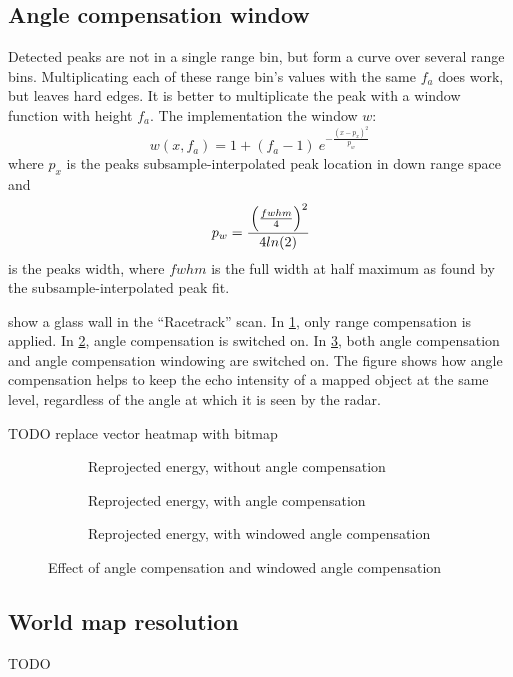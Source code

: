 \subsection{Angle compensation window}\label{angle-compensation-window}

Detected peaks are not in a single range bin, but form a curve over
several range bins. Multiplicating each of these range bin's values with
the same \(f_a\) does work, but leaves hard edges. It is better to
multiplicate the peak with a window function with height \(f_a\). The
implementation the window \(w\):
\[
w(x,f_a) = 1 + (f_a - 1) ~e ^ { -\frac{ \left( {x - p_x} \right) ^ 2 } {p_w} }
\] where \(p_x\) is the peaks subsample-interpolated peak location in
down range space and
\[
p_w = \cfrac{
\left( \frac{fwhm}{4}  \right) ^2
}{
4 ln(2)}
\]
is
the peaks width, where \(fwhm\) is the full width at half maximum as
found by the subsample-interpolated peak fit.

 show a glass wall in the ``Racetrack'' scan. In \cref{fig:fig_angle_compensation_comparison_1}, only range compensation is applied. In \cref{fig:fig_angle_compensation_comparison_2},
angle compensation is switched on. In \cref{fig:fig_angle_compensation_comparison_3}, both angle
compensation and angle compensation windowing are switched on. The
figure shows how angle compensation helps to keep the echo intensity of
a mapped object at the same level, regardless of the angle at which it
is seen by the radar.

TODO replace vector heatmap with bitmap
\begin{figure}[htbp]
    \centering
    \begin{subfigure}{\textwidth}
        \centering
        \def\svgscale{0.8} \small
        
        \caption{Reprojected energy, without angle compensation}
        \label{fig:fig_angle_compensation_comparison_1}
        \bigskip
    \end{subfigure}
    \begin{subfigure}{\textwidth}
        \centering
        \def\svgscale{0.8} \small
        
        \caption{Reprojected energy, with angle compensation}
        \label{fig:fig_angle_compensation_comparison_2}
        \bigskip
    \end{subfigure}
    \begin{subfigure}{\textwidth}
        \centering
        \def\svgscale{0.8} \small
        
        \caption{Reprojected energy, with windowed angle compensation}
        \label{fig:fig_angle_compensation_comparison_3}
        \bigskip
    \end{subfigure}
    \caption{Effect of angle compensation and windowed angle compensation}
    \label{fig:fig_angle_compensation_comparison}
\end{figure}


\subsection{World map resolution}\label{world-map-resolution}

TODO
